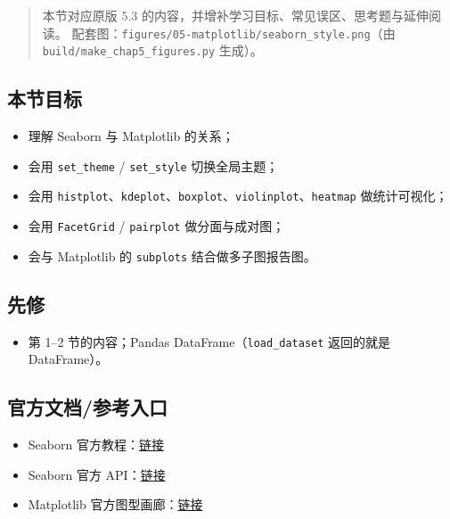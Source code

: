 \begin{quote}
本节对应原版 5.3 的内容，并增补学习目标、常见误区、思考题与延伸阅读。
配套图：\texttt{figures/05-matplotlib/seaborn\_style.png}（由
\texttt{build/make\_chap5\_figures.py} 生成）。
\end{quote}

\subsection{本节目标}\label{ux672cux8282ux76eeux6807-22}

\begin{itemize}
\tightlist
\item
  理解 Seaborn 与 Matplotlib 的关系；
\item
  会用 \texttt{set\_theme} / \texttt{set\_style} 切换全局主题；
\item
  会用
  \texttt{histplot}、\texttt{kdeplot}、\texttt{boxplot}、\texttt{violinplot}、\texttt{heatmap}
  做统计可视化；
\item
  会用 \texttt{FacetGrid} / \texttt{pairplot} 做分面与成对图；
\item
  会与 Matplotlib 的 \texttt{subplots} 结合做多子图报告图。
\end{itemize}

\subsection{先修}\label{ux5148ux4fee-15}

\begin{itemize}
\tightlist
\item
  第 1--2 节的内容；Pandas DataFrame（\texttt{load\_dataset} 返回的就是
  DataFrame）。
\end{itemize}

\subsection{官方文档/参考入口}\label{ux5b98ux65b9ux6587ux6863ux53c2ux8003ux5165ux53e3-4}

\begin{itemize}
\tightlist
\item
  Seaborn
  官方教程：\href{https://seaborn.pydata.org/tutorial.html}{链接}
\item
  Seaborn 官方 API：\href{https://seaborn.pydata.org/api.html}{链接}
\item
  Matplotlib
  官方图型画廊：\href{https://matplotlib.org/stable/gallery/index.html}{链接}
\end{itemize}

